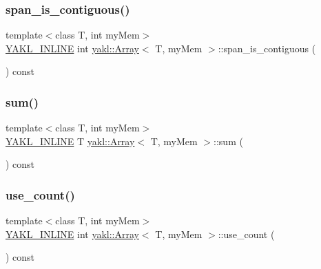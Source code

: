 \mbox{\label{classyakl_1_1Array_a6b821bfa69a3272560a5f21ef4a6ed07}} 
\subsubsection{\texorpdfstring{span\+\_\+is\+\_\+contiguous()}{span\_is\_contiguous()}}
{\footnotesize\ttfamily template$<$class T, int my\+Mem$>$ \\
\hyperlink{YAKL_8h_aa0dd629ffce6d564b19e9313fb91a5ad}{Y\+A\+K\+L\+\_\+\+I\+N\+L\+I\+NE} int \hyperlink{classyakl_1_1Array}{yakl\+::\+Array}$<$ T, my\+Mem $>$\+::span\+\_\+is\+\_\+contiguous (\begin{DoxyParamCaption}{ }\end{DoxyParamCaption}) const\hspace{0.3cm}{\ttfamily [inline]}}

\mbox{\label{classyakl_1_1Array_afe99f24bf88f807863b0c1c26c5957e4}} 
\subsubsection{\texorpdfstring{sum()}{sum()}}
{\footnotesize\ttfamily template$<$class T, int my\+Mem$>$ \\
\hyperlink{YAKL_8h_aa0dd629ffce6d564b19e9313fb91a5ad}{Y\+A\+K\+L\+\_\+\+I\+N\+L\+I\+NE} T \hyperlink{classyakl_1_1Array}{yakl\+::\+Array}$<$ T, my\+Mem $>$\+::sum (\begin{DoxyParamCaption}{ }\end{DoxyParamCaption}) const\hspace{0.3cm}{\ttfamily [inline]}}

\mbox{\label{classyakl_1_1Array_a68b8707eb5f271b577d72270dc1a8425}} 
\subsubsection{\texorpdfstring{use\+\_\+count()}{use\_count()}}
{\footnotesize\ttfamily template$<$class T, int my\+Mem$>$ \\
\hyperlink{YAKL_8h_aa0dd629ffce6d564b19e9313fb91a5ad}{Y\+A\+K\+L\+\_\+\+I\+N\+L\+I\+NE} int \hyperlink{classyakl_1_1Array}{yakl\+::\+Array}$<$ T, my\+Mem $>$\+::use\+\_\+count (\begin{DoxyParamCaption}{ }\end{DoxyParamCaption}) const\hspace{0.3cm}{\ttfamily [inline]}}



